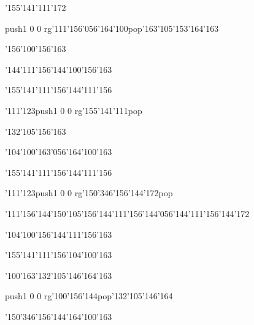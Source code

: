 \null\vfill\ipa\centerline{\enskip\enskip\enskip\enskip\char'155\char'141\char'111\char'172\enskip\enskip\enskip\enskip\enskip\enskip\enskip}\medskip\centerline{\enskip\pdfcolorstack\match push{1 0 0 rg}\char'111\char'156\char'056\char'164\char'100\pdfcolorstack\match pop{}\enskip\enskip\enskip\enskip\enskip\char'163\char'105\char'153\char'164\char'163}\medskip\centerline{\enskip\enskip\enskip\enskip\enskip\char'156\char'100\char'156\char'163\enskip\enskip\enskip\enskip\enskip\enskip\enskip\enskip\enskip\enskip\enskip\enskip}\medskip\centerline{\enskip\char'144\char'111\char'156\char'144\enskip\char'100\char'156\char'163\enskip\enskip\enskip\enskip\enskip\enskip\enskip}\medskip\vfill\footline{\hfil\tt\folio\hfil}\eject
\null\vfill\ipa\centerline{\enskip\enskip\enskip\enskip\char'155\char'141\char'111\char'156\enskip\enskip\enskip\enskip\char'144\char'111\char'156}\medskip\centerline{\enskip\char'111\char'123\enskip\enskip\enskip\enskip\pdfcolorstack\match push{1 0 0 rg}\char'155\char'141\char'111\pdfcolorstack\match pop{}\enskip\enskip\enskip\enskip\enskip\enskip}\medskip\centerline{\enskip\enskip\enskip\enskip\enskip\char'132\char'105\char'156\char'163\enskip\enskip\enskip\enskip\enskip\enskip\enskip\enskip\enskip\enskip\enskip\enskip}\medskip\centerline{\enskip\enskip\enskip\enskip\enskip\enskip\enskip\enskip\enskip\enskip\char'104\char'100\char'163\char'056\char'164\char'100\char'163}\medskip\vfill\footline{\hfil\tt\folio\hfil}\eject
\null\vfill\ipa\centerline{\enskip\enskip\enskip\enskip\char'155\char'141\char'111\char'156\enskip\enskip\enskip\enskip\char'144\char'111\char'156}\medskip\centerline{\enskip\char'111\char'123\enskip\enskip\enskip\enskip\enskip\enskip\enskip\enskip\pdfcolorstack\match push{1 0 0 rg}\char'150\char'346\char'156\char'144\char'172\pdfcolorstack\match pop{}}\medskip\centerline{\enskip\char'111\char'156\char'144\enskip\char'150\char'105\char'156\char'144\enskip\enskip\enskip\enskip\char'111\char'156\char'144\char'056\char'144\char'111\char'156\char'144\char'172}\medskip\centerline{\enskip\char'104\char'100\char'156\char'144\enskip\char'111\char'156\char'163\enskip\enskip\enskip\enskip\enskip\enskip\enskip}\medskip\vfill\footline{\hfil\tt\folio\hfil}\eject
\null\vfill\ipa\centerline{\enskip\enskip\enskip\enskip\char'155\char'141\char'111\char'156\enskip\enskip\enskip\enskip\char'104\char'100\char'163}\medskip\centerline{\enskip\char'100\char'163\enskip\enskip\enskip\enskip\enskip\enskip\enskip\enskip\char'132\char'105\char'146\char'164\char'163}\medskip\centerline{\enskip\pdfcolorstack\match push{1 0 0 rg}\char'100\char'156\char'144\pdfcolorstack\match pop{}\enskip\char'132\char'105\char'146\char'164\enskip\enskip\enskip\enskip\enskip\enskip\enskip\enskip\enskip\enskip\enskip\enskip}\medskip\centerline{\enskip\char'150\char'346\char'156\char'144\enskip\enskip\enskip\enskip\enskip\char'164\char'100\char'163\enskip\enskip\enskip\enskip}\medskip\vfill\footline{\hfil\tt\folio\hfil}\eject
